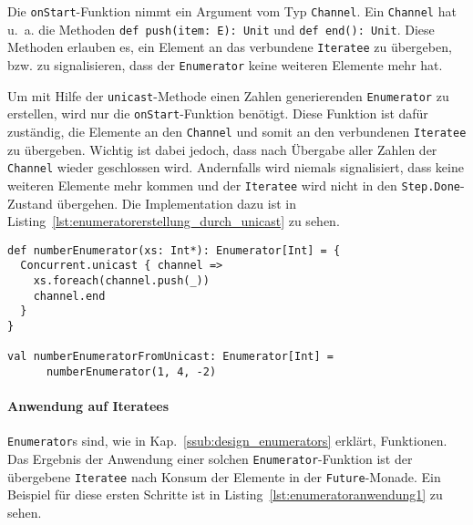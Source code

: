 \documentclass[draft=false
              ,paper=a4
              ,twoside=false
              ,fontsize=11pt
              ,headsepline
              ,BCOR10mm
              ,DIV11
              ]{scrbook}
\begin{document}
Die \lstinline|onStart|-Funktion nimmt ein Argument vom Typ \lstinline|Channel|.
Ein \lstinline|Channel| hat u.~a. die Methoden \lstinline[breaklines=true]|def push(item: E): Unit| und \lstinline[breaklines=true]|def end(): Unit|.
Diese Methoden erlauben es, ein Element an das verbundene \lstinline|Iteratee| zu übergeben, bzw. zu signalisieren, dass der \lstinline|Enumerator| keine weiteren Elemente mehr hat.

Um mit Hilfe der \lstinline|unicast|-Methode einen Zahlen generierenden \lstinline|Enumerator| zu erstellen, wird nur die \lstinline|onStart|-Funktion benötigt.
Diese Funktion ist dafür zuständig, die Elemente an den \lstinline|Channel| und somit an den verbundenen \lstinline|Iteratee| zu übergeben.
Wichtig ist dabei jedoch, dass nach Übergabe aller Zahlen der \lstinline|Channel| wieder geschlossen wird.
Andernfalls wird niemals signalisiert, dass keine weiteren Elemente mehr kommen und der \lstinline|Iteratee| wird nicht in den \lstinline|Step.Done|-Zustand übergehen.
Die Implementation dazu ist in Listing~\ref{lst:enumeratorerstellung_durch_unicast} zu sehen.

\begin{lstlisting}[caption=Erstellung eines Enumerators durch die unicast-Konstruktormethode, label=lst:enumeratorerstellung_durch_unicast]
def numberEnumerator(xs: Int*): Enumerator[Int] = {
  Concurrent.unicast { channel =>
    xs.foreach(channel.push(_))
    channel.end
  }
}

val numberEnumeratorFromUnicast: Enumerator[Int] =
      numberEnumerator(1, 4, -2)
\end{lstlisting}



\paragraph{Anwendung auf Iteratees} %
\label{par:anwendung_auf_iteratees}\mbox{} %

\lstinline|Enumerator|s sind, wie in Kap.~\ref{ssub:design_enumerators} erklärt, Funktionen.
Das Ergebnis der Anwendung einer solchen \lstinline|Enumerator|-Funktion ist der übergebene \lstinline|Iteratee| nach Konsum der Elemente in der \lstinline|Future|-Monade.
Ein Beispiel für diese ersten Schritte ist in Listing~\ref{lst:enumeratoranwendung1} zu sehen.
\end{document}
